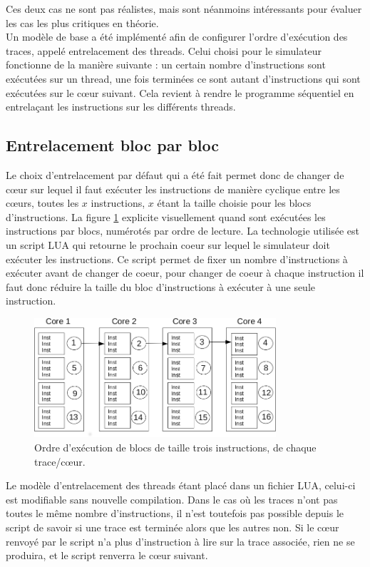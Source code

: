 Ces deux cas ne sont pas réalistes, mais sont néanmoins intéressants pour évaluer les cas les plus critiques en théorie.\\


Un modèle de base a été implémenté afin de configurer l'ordre d'exécution des traces, appelé entrelacement des threads. Celui choisi pour le simulateur fonctionne de la manière suivante : un certain nombre d'instructions sont exécutées sur un thread, une fois terminées ce sont autant d'instructions qui sont exécutées sur le c\oe ur suivant. Cela revient à rendre le programme  séquentiel en entrelaçant les instructions sur les différents threads.

\subsection{Entrelacement bloc par bloc}

Le choix d'entrelacement par défaut qui a été fait permet donc de changer de c\oe ur sur lequel il faut exécuter les instructions de manière cyclique entre les c\oe urs, toutes les $x$ instructions, $x$ étant la taille choisie pour les blocs d'instructions. La figure \ref{img:entrelacement} explicite visuellement quand sont exécutées les instructions par blocs, numérotés par ordre de lecture. La technologie utilisée est un script LUA qui retourne le prochain coeur sur lequel le simulateur doit exécuter les instructions. Ce script permet de fixer un nombre d'instructions à exécuter avant de changer de coeur, pour changer de coeur à chaque instruction il faut donc réduire la taille du bloc d'instructions à exécuter à une seule instruction.\\

\begin{figure}[!h]
\begin{center}
   \includegraphics[width=0.8\textwidth]{images/entrelacement.png}
   \caption{\label{img:entrelacement} Ordre d'exécution de blocs de taille trois instructions, de chaque trace/c\oe ur.}
\end{center}
\end{figure}



Le modèle d'entrelacement des threads étant placé dans un fichier LUA, celui-ci est modifiable sans nouvelle compilation. Dans le cas où les traces n'ont pas toutes le même nombre d'instructions, il n'est toutefois pas possible depuis le script de savoir si une trace est terminée alors que les autres non. Si le c\oe ur renvoyé par le script n'a plus d'instruction à lire sur la trace associée, rien ne se produira, et le script renverra le c\oe ur suivant. 

